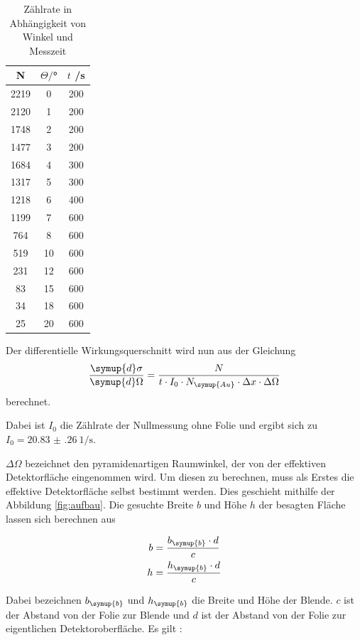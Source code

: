 \begin{table}[H]
  \centering
  \caption{Zählrate in Abhängigkeit von Winkel und Messzeit}
  \label{tab:Parameter}
  \begin{tabular}{c c c}
    \toprule
    N & $\Theta/$° & $t$ /s\\
    \midrule
    2219 &  0 & 200 \\
    2120 &  1 & 200 \\
    1748 &  2 & 200 \\
    1477 &  3 & 200 \\
    1684 &  4 & 300 \\
    1317 &  5 & 300 \\
    1218 &  6 & 400 \\
    1199 &  7 & 600 \\
     764 &  8 & 600 \\
     519 & 10 & 600 \\
     231 & 12 & 600 \\
      83 & 15 & 600 \\
      34 & 18 & 600 \\
      25 & 20 & 600 \\
    \bottomrule
  \end{tabular}
\end{table}

Der differentielle Wirkungsquerschnitt wird nun aus der Gleichung
\begin{equation}
  \frac{\symup{d}\sigma}{\symup{d}\Omega} = \frac{N}{t \cdot I_0 \cdot N_\symup{Au} \cdot \Delta x \cdot \Delta \Omega}
  \label{eqn:wq}
\end{equation}
berechnet.

Dabei ist $I_0$ die Zählrate der Nullmessung ohne Folie und ergibt sich zu $I_0 =\SI{20.83(26)}{1\per\second}$.

$\Delta \Omega$ bezeichnet den pyramidenartigen Raumwinkel, der von
der effektiven Detektorfläche eingenommen wird. Um diesen zu berechnen, muss
als Erstes die effektive Detektorfläche selbst bestimmt werden. Dies geschieht
mithilfe der Abbildung \ref{fig:aufbau}. Die gesuchte Breite $b$ und Höhe $h$ der
besagten Fläche lassen sich berechnen aus

\begin{align*}
  b &= \frac{b_\symup{b} \cdot d}{c} \\
  h &= \frac{h_\symup{b} \cdot d}{c}
\end{align*}

Dabei bezeichnen $b_\symup{b}$ und $h_\symup{b}$ die Breite und Höhe der Blende.
$c$ ist der Abstand von der Folie zur Blende und $d$ ist der Abstand von der Folie
zur eigentlichen Detektoroberfläche. Es gilt \cite{sample1}:


